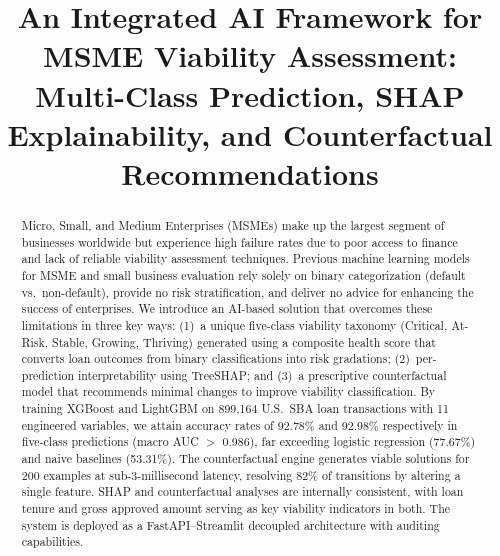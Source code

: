 \documentclass[conference]{IEEEtran}
\begin{document}
\title{An Integrated AI Framework for MSME Viability Assessment: Multi-Class Prediction, SHAP Explainability, and Counterfactual Recommendations}

\author{
\and
{}
}

\maketitle

\begin{abstract}
Micro, Small, and Medium Enterprises (MSMEs) make up the largest segment of businesses worldwide but experience high failure rates due to poor access to finance and lack of reliable viability assessment techniques. Previous machine learning models for MSME and small business evaluation rely solely on binary categorization (default vs.\ non-default), provide no risk stratification, and deliver no advice for enhancing the success of enterprises. We introduce an AI-based solution that overcomes these limitations in three key ways: (1)~a unique five-class viability taxonomy (Critical, At-Risk, Stable, Growing, Thriving) generated using a composite health score that converts loan outcomes from binary classifications into risk gradations; (2)~per-prediction interpretability using TreeSHAP; and (3)~a prescriptive counterfactual model that recommends minimal changes to improve viability classification. By training XGBoost and LightGBM on 899,164 U.S.\ SBA loan transactions with 11 engineered variables, we attain accuracy rates of 92.78\% and 92.98\% respectively in five-class predictions (macro AUC $>$ 0.986), far exceeding logistic regression (77.67\%) and naive baselines (53.31\%). The counterfactual engine generates viable solutions for 200 examples at sub-3-millisecond latency, resolving 82\% of transitions by altering a single feature. SHAP and counterfactual analyses are internally consistent, with loan tenure and gross approved amount serving as key viability indicators in both. The system is deployed as a FastAPI--Streamlit decoupled architecture with auditing capabilities.
\end{abstract}
\end{document}
